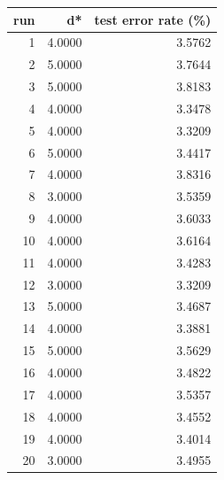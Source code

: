 \begin{tabular}{rrr}
\toprule
run & d* & test error rate (\%) \\
\midrule
1 & 4.0000 & 3.5762 \\
2 & 5.0000 & 3.7644 \\
3 & 5.0000 & 3.8183 \\
4 & 4.0000 & 3.3478 \\
5 & 4.0000 & 3.3209 \\
6 & 5.0000 & 3.4417 \\
7 & 4.0000 & 3.8316 \\
8 & 3.0000 & 3.5359 \\
9 & 4.0000 & 3.6033 \\
10 & 4.0000 & 3.6164 \\
11 & 4.0000 & 3.4283 \\
12 & 3.0000 & 3.3209 \\
13 & 5.0000 & 3.4687 \\
14 & 4.0000 & 3.3881 \\
15 & 5.0000 & 3.5629 \\
16 & 4.0000 & 3.4822 \\
17 & 4.0000 & 3.5357 \\
18 & 4.0000 & 3.4552 \\
19 & 4.0000 & 3.4014 \\
20 & 3.0000 & 3.4955 \\
\bottomrule
\end{tabular}
